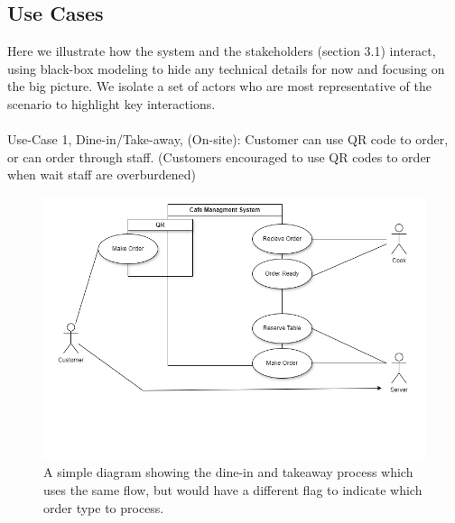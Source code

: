 \documentclass{article}
\begin{document}
\subsection{Use Cases}
Here we illustrate how the system and the stakeholders (section 3.1) interact, using black-box modeling to hide any technical details for now and focusing on the big picture. We isolate a set of actors who are most representative of the scenario to highlight key interactions.
\\
\\
Use-Case 1, Dine-in/Take-away, (On-site):
Customer can use QR code to order, or can order through staff. (Customers encouraged to use QR codes to order when wait staff are overburdened) 
\\
\begin{figure}[h!]
    \centering
    \includegraphics[width=1\linewidth]{DineIn_Takeaway.drawio.png}
    \caption{A simple diagram showing the dine-in and takeaway process which uses the same flow, but would have a different flag to indicate which order type to process. }
    \label{fig:enter-label}
\end{figure}
\end{document}

